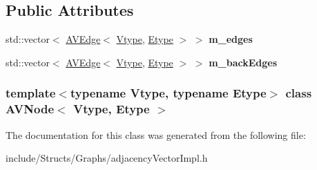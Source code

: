 \subsection*{Public Attributes}
\begin{DoxyCompactItemize}
\item 
\hypertarget{class_a_v_node_a08e3efa2a9bad0d51ef552615a61ec99}{
std::vector$<$ \hyperlink{class_a_v_edge}{AVEdge}$<$ \hyperlink{class_vtype}{Vtype}, \hyperlink{class_etype}{Etype} $>$ $>$ {\bfseries m\_\-edges}}
\label{class_a_v_node_a08e3efa2a9bad0d51ef552615a61ec99}

\item 
\hypertarget{class_a_v_node_ae5b19d92080fa5a142e939bdf81daf3d}{
std::vector$<$ \hyperlink{class_a_v_edge}{AVEdge}$<$ \hyperlink{class_vtype}{Vtype}, \hyperlink{class_etype}{Etype} $>$ $>$ {\bfseries m\_\-backEdges}}
\label{class_a_v_node_ae5b19d92080fa5a142e939bdf81daf3d}

\end{DoxyCompactItemize}
\subsubsection*{template$<$typename Vtype, typename Etype$>$ class AVNode$<$ Vtype, Etype $>$}



The documentation for this class was generated from the following file:\begin{DoxyCompactItemize}
\item 
include/Structs/Graphs/adjacencyVectorImpl.h\end{DoxyCompactItemize}
